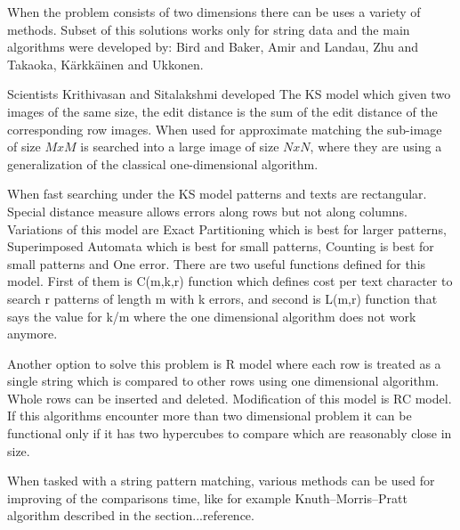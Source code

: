 When the problem consists of two dimensions there can be uses a variety of methods. Subset of this solutions works only for string data and the main algorithms were developed by: Bird and Baker, Amir and Landau, Zhu and Takaoka, K{\"a}rkk{\"a}inen and Ukkonen.

Scientists Krithivasan and Sitalakshmi developed The KS model which given two images of the same size, the edit distance is the sum of the edit distance of the corresponding row images. When used for approximate matching the sub-image of size $MxM$ is searched into a large image of size $NxN$, where they are using a generalization of the classical one-dimensional algorithm.

When fast searching under the KS model patterns and texts are rectangular. Special distance measure allows errors along rows but not along columns. Variations of this model are Exact Partitioning which is best for larger patterns, Superimposed Automata which is best for small patterns, Counting is best for small patterns and One error. There are two useful functions defined for this model. First of them is C(m,k,r) function which defines cost per text character to search r patterns of length m with k errors, and second is L(m,r) function that says the value for k/m where the one dimensional algorithm does not work anymore.

Another option to solve this problem is R model where each row is treated as a single string which is compared to other rows using one dimensional algorithm. Whole rows can be inserted and deleted. Modification of this model is RC model. If this algorithms encounter more than two dimensional problem it can be functional only if it has two hypercubes to compare which are reasonably close in size.

When tasked with a string pattern matching, various methods can be used for improving of the comparisons time, like for example Knuth--Morris--Pratt algorithm described in the section...reference.


